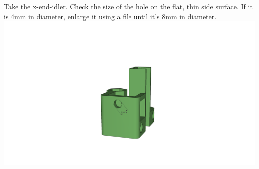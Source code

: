 \documentclass[twoside,openany,a4paper,titlepage]{memoir}
\begin{document}
	\section{}
	Take the x-end-idler. Check the size of the hole on the flat, thin side surface. If it is 4mm in diameter,
	enlarge it using a file until it's 8mm in diameter.\\
	\includegraphics[width=1\linewidth]{graphics/ch7_2.png}
	
\end{document}
